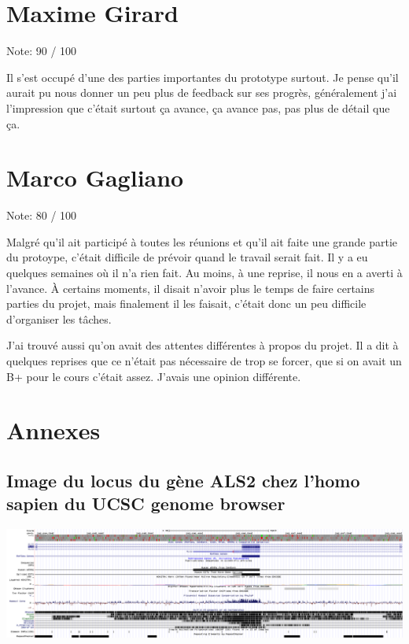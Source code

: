 \documentclass[11pt]{article} %
\renewcommand{\thesubsection}{\alph{subsection}}
\begin{document}
 
\section{Maxime Girard}

{\LARGE Note: 90 / 100}

Il s'est occupé d'une des parties importantes du prototype surtout. Je pense qu'il aurait pu nous donner un
peu plus de feedback sur ses progrès, généralement j'ai l'impression que c'était surtout ça avance, ça avance pas, 
pas plus de détail que ça.


 
\section{Marco Gagliano} 
 
{\LARGE Note: 80 / 100}

Malgré qu'il ait participé à toutes les réunions et qu'il ait faite une grande partie du protoype, c'était
difficile de prévoir quand le travail serait fait. Il y a eu quelques semaines où il n'a rien fait. Au moins,
à une reprise, il nous en a averti à l'avance. À certains moments, il disait n'avoir plus le temps
de faire certains parties du projet, mais finalement il les faisait, c'était donc un peu difficile
d'organiser les tâches.

J'ai trouvé aussi qu'on avait des attentes différentes à propos du projet. Il a dit à quelques reprises
que ce n'était pas nécessaire de trop se forcer, que si on avait un B+ pour le cours c'était assez. J'avais
une opinion différente.



\begingroup
\renewcommand{\appendix}{%
    \renewcommand{\thesubsection}{\arabic{subsection}}
}

\appendix
\section{Annexes}
\subsection{Image du locus du gène ALS2 chez l'homo sapien du UCSC genome browser}\label{1}
\includegraphics[width=\linewidth]{annexes/annexe1_ucsc.png}
\end{document}

